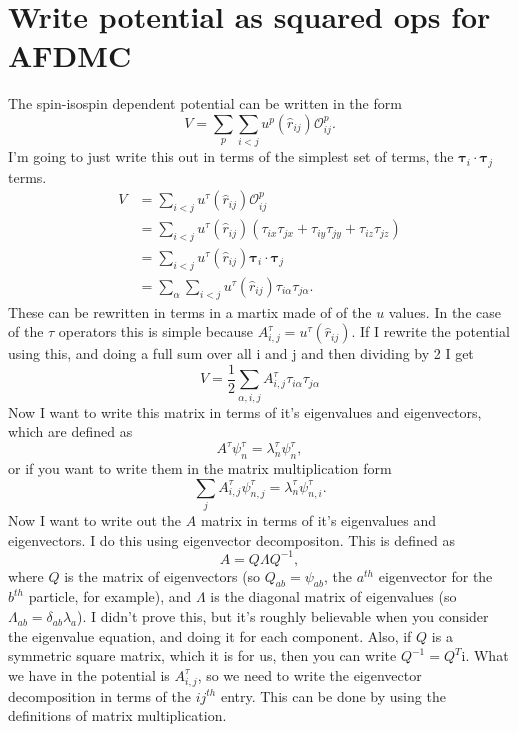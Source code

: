 \documentclass[12pt]{extarticle}
\newcommand{\Oijp}{\mathcal{O}^p_{ij}}
\newcommand{\ti}{\bm{\tau}_i}
\newcommand{\tj}{\bm{\tau}_j}
\newcommand{\rij}{\hat{r}_{ij}}
\newcommand{\tia}{\tau_{i\alpha}}
\newcommand{\tja}{\tau_{j\alpha}}
\newcommand{\Aijt}{A^{\tau}_{i,j}}
\begin{document}
\section{Write potential as squared ops for AFDMC}
\label{app:hsprep}
The spin-isospin dependent potential can be written in the form
\begin{equation}
   V = \sum\limits_p\sum\limits_{i<j} u^p(\rij)\Oijp.
\end{equation}
I'm going to just write this out in terms of the simplest set of terms, the $\ti\cdot\tj$ terms.
\begin{align}
   V &= \sum\limits_{i<j} u^\tau(\rij)\Oijp \\
   &= \sum\limits_{i<j} u^\tau(\rij)\left(\tau_{ix}\tau_{jx}+\tau_{iy}\tau_{jy}+\tau_{iz}\tau_{jz}\right) \\
   &= \sum\limits_{i<j} u^\tau(\rij)\ti\cdot\tj \\
   &= \sum\limits_\alpha\sum\limits_{i<j} u^\tau(\rij)\tia\tja.
\end{align}
These can be rewritten in terms in a martix made of of the $u$ values. In the case of the $\tau$ operators this is simple because $\Aijt=u^\tau(\rij)$. If I rewrite the potential using this, and doing a full sum over all i and j and then dividing by 2 I get
\begin{equation}
   V = \frac{1}{2}\sum\limits_{\alpha,i,j} \Aijt\tia\tja
\end{equation}
Now I want to write this matrix in terms of it's eigenvalues and eigenvectors, which are defined as
\begin{equation}
   A^{\tau}\psi_n^\tau=\lambda_n^\tau\psi_n^\tau,
\end{equation}
or if you want to write them in the matrix multiplication form
\begin{equation}
   \sum\limits_j\Aijt\psi_{n,j}^\tau = \lambda_n^\tau\psi_{n,i}^\tau.
\end{equation}
Now I want to write out the $A$ matrix in terms of it's eigenvalues and eigenvectors. I do this using eigenvector decompositon. This is defined as
\begin{equation}
   A=Q\Lambda Q^{-1},
\end{equation}
where $Q$ is the matrix of eigenvectors (so $Q_{ab}=\psi_{ab}$, the $a^{th}$ eigenvector for the $b^{th}$ particle, for example), and $\Lambda$ is the diagonal matrix of eigenvalues (so $\Lambda_{ab}=\delta_{ab}\lambda_a$). I didn't prove this, but it's roughly believable when you consider the eigenvalue equation, and doing it for each component. Also, if $Q$ is a symmetric square matrix, which it is for us, then you can write $Q^{-1}=Q^T$i. What we have in the potential is $\Aijt$, so we need to write the eigenvector decomposition in terms of the $ij^{th}$ entry. This can be done by using the definitions of matrix multiplication.
\end{document}
